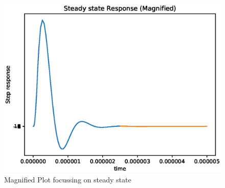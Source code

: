 \begin{enumerate}[label=\arabic*.,ref=\theenumi]
\begin{figure}[!h]
    \centering
    \includegraphics[width=\columnwidth]{./figs/ee18btech11026/ee18btech11026_spice_result_rc_bf_mag.eps}
    \caption{Magnified Plot focussing on steady state}
    \label{fig:ee18btech11026_rc_fb_mag}
\end{figure}



\renewcommand{\thefigure}{\theenumi}

\begin{table}[!ht]
\centering

\caption{}
\label{table:ee18btech11026_Table_3}
\end{table}

\end{enumerate}

